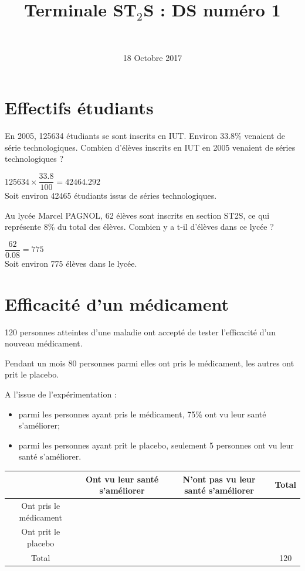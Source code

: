 \documentclass[a4paper,11pt]{exam}
\author{\ }
\date{18 Octobre 2017}
\title{Terminale ST$_2$S : DS num\'ero 1}
\begin{document}
%	

	\maketitle

\section{Effectifs étudiants}
	
	\begin{questions}
		\question En 2005, \num{125634} étudiants se sont inscrits en IUT. Environ \num{33.8}\% venaient de série technologiques. Combien d'élèves inscrits en IUT en 2005 venaient de séries technologiques ?
		\begin{solution}
			$ \num{125634} \times \dfrac{\num{33.8}}{100} = \num{42464.292} $ \\
			Soit environ \num{42465} étudiants issus de séries technologiques.
		\end{solution}
		
		\question Au lycée Marcel PAGNOL, 62 élèves sont inscrits en section ST2S, ce qui représente 8\% du total des élèves. Combien y a t-il d'élèves dans ce lycée ?
		\begin{solution}
			$ \dfrac{\num{62}}{\num{0.08}} = 775 $ \\
			Soit environ 775 élèves dans le lycée.
		\end{solution}
	\end{questions}


\section{Efficacité d'un médicament}

120 personnes atteintes d'une maladie ont accepté de tester l'efficacité d'un nouveau médicament. 

Pendant un mois 80 personnes parmi elles ont pris le médicament, les autres ont prit le placebo.

A l'issue de l'expérimentation :
\begin{itemize}
	\item parmi les personnes ayant pris le médicament, 75\% ont vu leur santé s'améliorer;
	\item parmi les personnes ayant prit le placebo, seulement 5 personnes ont vu leur santé s'améliorer.
\end{itemize} 
\begin{center}
	
{\small \begin{tabular}{|@{\ }c@{\ }|@{\ }c@{\ }|@{\ }c@{\ }|@{\ }c@{\ }|}
	\hline
	& Ont vu leur santé s'améliorer & N'ont pas vu leur santé s'améliorer &  Total  \\
	\hline
	Ont pris le médicament &  &  &    \\
	\hline
	Ont prit le placebo &  &  &   \\
	\hline
	Total &  &  & 120   \\
	\hline
\end{tabular}}
\end{center}
\end{document}
